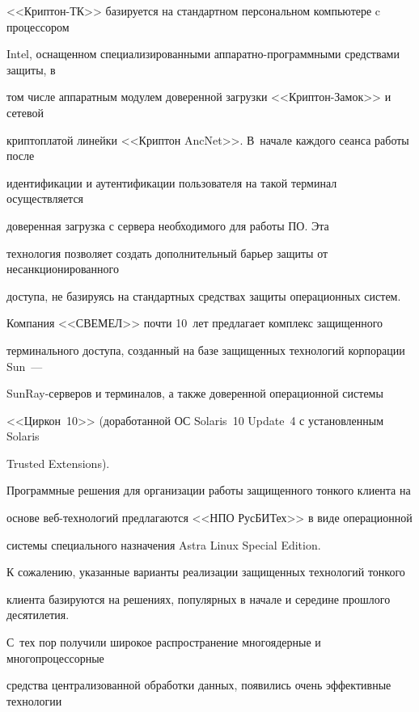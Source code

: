 <<Крип\-тон-ТК>> базируется на стандартном персональном компьютере c процессором 


Intel, оснащенном специализированными ап\-па\-рат\-но-про\-грам\-мны\-ми средствами защиты, в 


том числе аппаратным модулем доверенной загрузки <<Крип\-тон-За\-мок>> и сетевой 


криптоплатой линейки <<Криптон AncNet>>. В~начале каждого сеанса работы после 


идентификации и аутентификации пользователя на такой терминал осуществляется 


доверенная загрузка с сервера необходимого для работы ПО. Эта 


технология позволяет создать дополнительный барьер защиты от несанкционированного 


доступа, не базируясь на стандартных средствах защиты операционных систем.


       


       Компания <<СВЕМЕЛ>> почти 10~лет предлагает комплекс защищенного 


терминального доступа, созданный на базе защищенных технологий корпорации Sun~--- 


SunRay-сер\-ве\-ров и терминалов, а также доверенной операционной системы 


       <<Цир\-кон~10>> (доработанной ОС Solaris~10 Update~4 с установленным Solaris 


Trusted Extensions).


       


       Программные решения для организации работы защищенного тонкого клиента на 


основе веб-тех\-но\-ло\-гий предлагаются <<НПО РусБИТех>> в виде операционной 


системы специального назначения Astra Linux Special Edition.


       


       К сожалению, указанные варианты реализации защищенных технологий тонкого 


клиента базируются на решениях, популярных в начале и середине прошлого десятилетия. 


С~тех пор получили широкое распространение многоядерные и многопроцессорные 


средства централизованной обработки данных, появились очень эффективные технологии 


